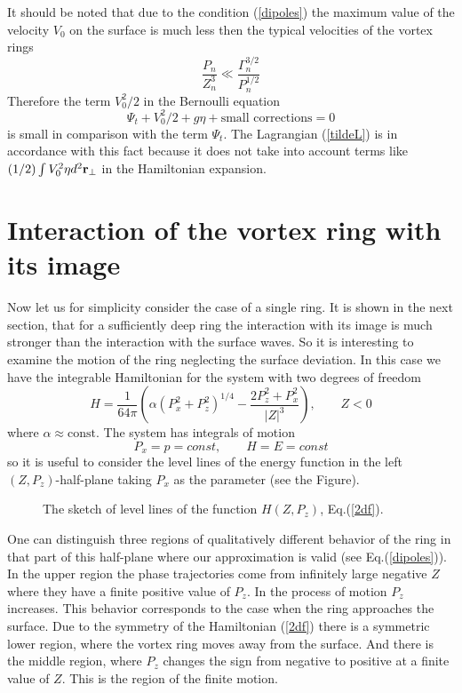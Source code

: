It should be noted that due to the condition (\ref{dipoles}) the maximum
value of the velocity $V_0$ on the surface is much less then the typical 
velocities of the vortex rings
$$
\frac{P_n}{Z_n^3}\ll\frac{\Gamma_n^{3/2}}{P_n^{1/2}}
$$ 
Therefore the term $V_0^2/2$ in the Bernoulli equation 
$$
\Psi_t +V_0^2/2 +g\eta +\mbox{small corrections}=0
$$
is small in comparison with the term $\Psi_t$. 
The Lagrangian (\ref{tildeL}) is in accordance with this fact because it does 
not take into account terms like 
$(1/2)\int V_0^2\eta d^2{\bf r}_\bot$ in the Hamiltonian expansion.

\section{Interaction of the vortex ring with its image}

Now let us for simplicity consider the case of a single ring.
It is shown in the next section, 
that for a sufficiently deep ring the interaction with its image 
is much stronger than the interaction with the surface waves.
So it is interesting to examine the motion of the 
ring neglecting the surface deviation. 
In this case we have the integrable Hamiltonian for the system 
with two degrees of freedom
\begin{equation}\label{2df}
H=\frac{1}{64\pi}\left(
\alpha(P_x^2+P_z^2)^{1/4} -\frac{2P_z^2+P_x^2}{|Z|^3}\right),
\qquad Z<0
\end{equation}
where $\alpha\approx \mbox{const}$. The system has integrals of motion
$$
P_x=p=const, \qquad H=E=const
$$
so it is useful to consider the level lines of the energy function
in the left $(Z,P_z)$-half-plane taking $P_x$ as the parameter 
(see the Figure).
\begin{figure}
\label{E_levels}
\epsfxsize=360pt
\caption{ The sketch of level lines of the function 
$H(Z,P_z)$, Eq.(\ref{2df}).}
\end{figure}

One can distinguish three regions of qualitatively different behavior 
of the ring in that part of this half-plane where our approximation is valid
(see Eq.(\ref{dipoles})). 
In the upper region the phase trajectories come from infinitely
large negative $Z$ where they have a finite positive value of $P_z$. 
In the process of motion $P_z$ increases.
This behavior corresponds to the case when the ring approaches the surface. 
Due to the symmetry of the Hamiltonian (\ref{2df}) there is
a symmetric lower region, where the vortex ring moves away from the surface.
And there is the middle region, where $P_z$ changes the sign from negative to
positive at a finite value of $Z$. This is the region of the finite motion.

